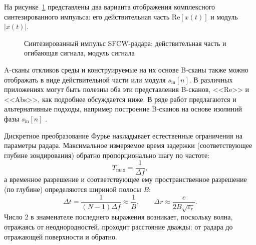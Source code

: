 На рисунке~\ref{fig:sfcw-pulse-placeholder} представлены два варианта отображения комплексного синтезированного импульса: его действительная часть $\mathrm{Re}[x(t)]$ и модуль $|x(t)|$.

\begin{figure}[H]
    \centering
    \caption{Синтезированный импульс SFCW-радара: действительная часть и огибающая сигнала, модуль сигнала}
    \label{fig:sfcw-pulse-placeholder}
\end{figure}

A-сканы откликов среды и конструируемые на их основе B-сканы также можно отображать в виде действительной части или модуля $s_{\mathrm{in}}[n]$. В различных приложениях могут быть полезны оба эти представления B-сканов, <<Re>> и <<Abs>>, как подробнее обсуждается ниже. В ряде работ предлагаются и альтернативные подходы, например построение B-сканов на основе изолиний фазы $s_{\mathrm{in}}[n]$ \cite{sugak2009phase}.

Дискретное преобразование Фурье накладывает естественные ограничения на параметры радара. Максимальное измеряемое время задержки (соответствующее глубине зондирования) обратно пропорционально шагу по частоте:
\begin{equation}
    T_{\max} = \frac{1}{\Delta f},
\end{equation}
а временное разрешение и соответствующее ему пространственное разрешение (по глубине) определяются шириной полосы $B$:
\begin{equation}
    \Delta t = \frac{1}{(N - 1)\Delta f} \approx \frac{1}{B}, \qquad
    \Delta r \approx \frac{c}{2B\sqrt{\varepsilon_r}}.
    \label{eq:range-resolution}
\end{equation}
Число 2 в знаменателе последнего выражения возникает, поскольку волна, отражаясь от неоднородностей, проходит расстояние дважды: от радара до отражающей поверхности и обратно.

